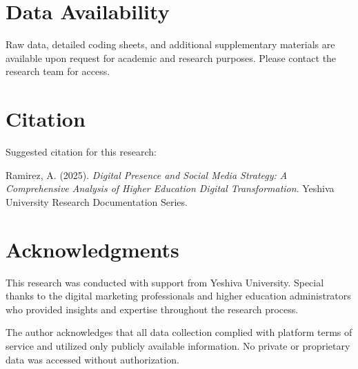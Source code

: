 \documentclass[12pt]{report}
\begin{document}
\section{Data Availability}

Raw data, detailed coding sheets, and additional supplementary materials are available upon request for academic and research purposes. Please contact the research team for access.

\section{Citation}

Suggested citation for this research:

Ramirez, A. (2025). \textit{Digital Presence and Social Media Strategy: A Comprehensive Analysis of Higher Education Digital Transformation}. Yeshiva University Research Documentation Series.

\section{Acknowledgments}

This research was conducted with support from Yeshiva University. Special thanks to the digital marketing professionals and higher education administrators who provided insights and expertise throughout the research process.

The author acknowledges that all data collection complied with platform terms of service and utilized only publicly available information. No private or proprietary data was accessed without authorization.
\end{document}
